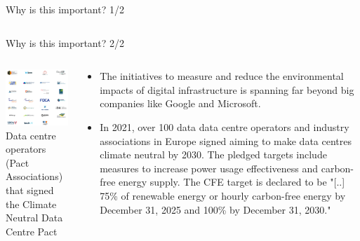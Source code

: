 \begin{frame}{Why is this important? 1/2}
{\begin{columns}[T]
    \end{columns}

  }
\end{frame}


\begin{frame}{Why is this important? 2/2}

  {\footnotesize

  \begin{columns}[T]

    \begin{column}{6cm}
      \centering
      \vspace{.5cm}
      \includegraphics[width=6cm]{images/climateneutraldatacentre.png}
      {\scriptsize
      Data centre operators (Pact Associations) that signed \\ 
      the Climate Neutral Data Centre Pact}
    \end{column}

    \begin{column}{9cm}

      \begin{itemize}
        \item  The initiatives to measure and reduce the environmental impacts of digital infrastructure is spanning far beyond big companies like Google and  Microsoft.
        
        \item In 2021, over 100 data data centre operators and industry associations in Europe signed  aiming to make data centres climate neutral by 2030. The pledged targets include measures to increase power usage effectiveness and carbon-free energy supply. The CFE target is declared to be "[..] 75\% of renewable energy or hourly carbon-free energy by December 31, 2025 and 100\% by December 31, 2030." 


\end{itemize}
\end{column}
\end{columns}}
\end{frame}

